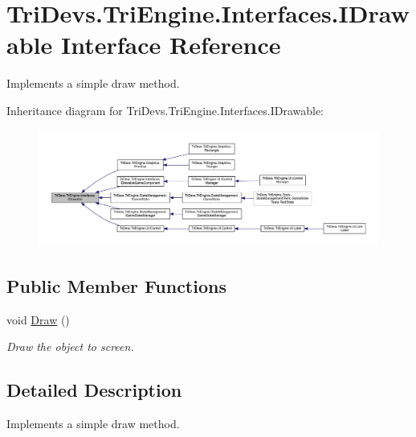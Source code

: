\hypertarget{interface_tri_devs_1_1_tri_engine_1_1_interfaces_1_1_i_drawable}{\section{Tri\-Devs.\-Tri\-Engine.\-Interfaces.\-I\-Drawable Interface Reference}
\label{interface_tri_devs_1_1_tri_engine_1_1_interfaces_1_1_i_drawable}
}


Implements a simple draw method.  




Inheritance diagram for Tri\-Devs.\-Tri\-Engine.\-Interfaces.\-I\-Drawable\-:
\nopagebreak
\begin{figure}[H]
\begin{center}
\leavevmode
\includegraphics[width=350pt]{interface_tri_devs_1_1_tri_engine_1_1_interfaces_1_1_i_drawable__inherit__graph}
\end{center}
\end{figure}
\subsection*{Public Member Functions}
\begin{DoxyCompactItemize}
\item 
void \hyperlink{interface_tri_devs_1_1_tri_engine_1_1_interfaces_1_1_i_drawable_ac3ca4755140905755e8ad59d497447f0}{Draw} ()
\begin{DoxyCompactList}\small\item\em Draw the object to screen. \end{DoxyCompactList}\end{DoxyCompactItemize}


\subsection{Detailed Description}
Implements a simple draw method. 



